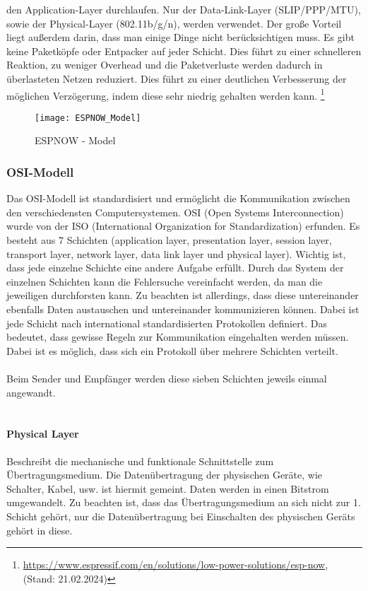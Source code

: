 \documentclass[titlepage,12pt,twoside]{article}
\begin{document}
den Application-Layer durchlaufen. Nur der Data-Link-Layer (SLIP/PPP/MTU), 
sowie der Physical-Layer (802.11b/g/n), werden verwendet. 
Der große Vorteil liegt außerdem 
darin, dass man einige Dinge nicht berücksichtigen muss. Es gibt keine 
Paketköpfe oder Entpacker auf jeder Schicht. Dies führt zu einer schnelleren 
Reaktion, zu weniger Overhead und die Paketverluste werden dadurch in überlasteten Netzen 
reduziert. Dies führt zu einer deutlichen Verbesserung der möglichen
Verzögerung, indem diese sehr niedrig gehalten werden kann. \footnote{\url{https://www.espressif.com/en/solutions/low-power-solutions/esp-now}, (Stand: 21.02.2024)} \\
\begin{figure}[H]
	\begin{center}
		\scalebox{1.0}
		{\texttt{[image: ESPNOW\_Model]}}
		\caption{ESPNOW - Model}
		\label{fig:ESPNOW_Model}
	\end{center}
\end{figure}

\subsubsection{OSI-Modell}
\label{chap:OSI-Modell}
Das OSI-Modell ist standardisiert und ermöglicht die Kommunikation zwischen den 
verschiedensten Computersystemen. OSI (Open Systems Interconnection) wurde von der 
ISO (International Organization for Standardization) erfunden. 
Es besteht aus 7 Schichten (application layer, presentation layer, session layer, 
transport layer, network layer, data link layer und physical layer). Wichtig ist, 
dass jede einzelne Schichte eine andere Aufgabe erfüllt. Durch das System der 
einzelnen Schichten kann die Fehlersuche vereinfacht werden, da man die jeweiligen 
durchforsten kann. Zu beachten ist allerdings, dass diese untereinander ebenfalls 
Daten austauschen und untereinander kommunizieren können. Dabei ist jede Schicht 
nach international standardisierten Protokollen definiert. Das bedeutet, dass gewisse 
Regeln zur Kommunikation eingehalten werden müssen. Dabei ist es möglich, dass sich 
ein Protokoll über mehrere Schichten verteilt. \\
\\
Beim Sender und Empfänger werden diese sieben Schichten jeweils einmal angewandt. \\
\\

\paragraph{Physical Layer}
\label{par:Physical Layer}
\hfill \break
\hfill \break
Beschreibt die mechanische und funktionale Schnittstelle zum Übertragungsmedium. Die 
Datenübertragung der physischen Geräte, wie Schalter, Kabel, usw. ist hiermit gemeint. 
Daten werden in einen Bitstrom umgewandelt. Zu beachten ist, dass das Übertragungsmedium 
an sich nicht zur 1. Schicht gehört, nur die Datenübertragung bei Einschalten des 
physischen Geräts gehört in diese.\\
\end{document}
